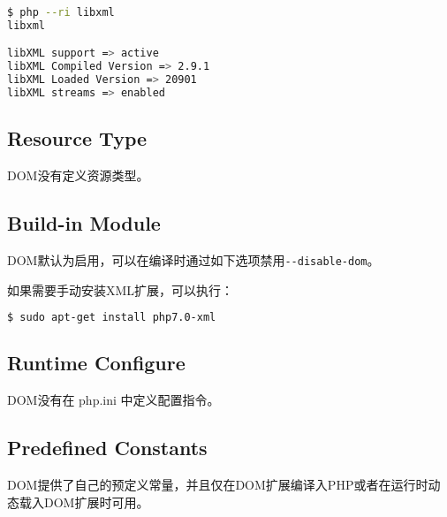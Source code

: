 \begin{lstlisting}[language=bash]
$ php --ri libxml
libxml

libXML support => active
libXML Compiled Version => 2.9.1
libXML Loaded Version => 20901
libXML streams => enabled
\end{lstlisting}


\subsection{Resource Type}

DOM没有定义资源类型。


\subsection{Build-in Module}

DOM默认为启用，可以在编译时通过如下选项禁用\texttt{-\/-disable-dom}。

如果需要手动安装XML扩展，可以执行：

\begin{lstlisting}[language=bash]
$ sudo apt-get install php7.0-xml
\end{lstlisting}



\subsection{Runtime Configure}

DOM没有在 php.ini 中定义配置指令。





\subsection{Predefined Constants}

DOM提供了自己的预定义常量，并且仅在DOM扩展编译入PHP或者在运行时动态载入DOM扩展时可用。


